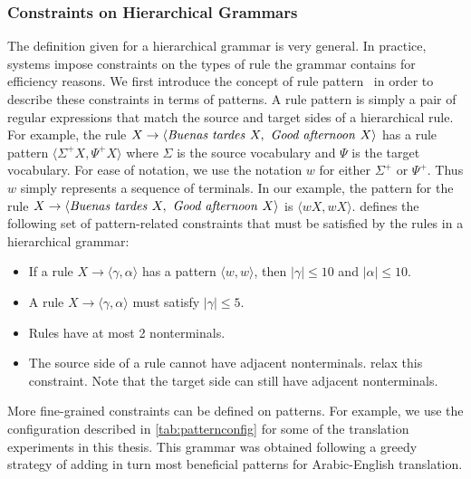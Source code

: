 \subsubsection{Constraints on Hierarchical Grammars}

The definition given for a hierarchical grammar is very general.
In practice, systems impose constraints on the types of rule the grammar contains
for efficiency reasons.
We first introduce the concept of rule
pattern~\citep{iglesias-degispert-banga-byrne:2009:EACL} in order
to describe these constraints in terms of patterns.
A rule pattern is simply a pair of regular expressions that match
the source and target sides of a hierarchical rule.
For example, the rule $X \rightarrow \langle \text{\emph{Buenas tardes }} X, \text{\emph{ Good afternoon }} X \rangle$
has a rule pattern $\langle \Sigma^+ X, \Psi^+ X \rangle$ where $\Sigma$ is the
source vocabulary and $\Psi$ is the target vocabulary.
For ease of notation, we use the notation $w$ for either $\Sigma^+$
or $\Psi^+$. Thus $w$ simply represents a sequence of terminals.
In our example, the pattern for the rule $ X \rightarrow \langle \text{\emph{Buenas tardes }} X, \text{\emph{ Good afternoon }} X \rangle$ is $\langle w X, w X \rangle$.
\citet{chiang:2007:CL} defines the following set of pattern-related constraints
that must be satisfied by the rules in a hierarchical grammar:
%
\begin{itemize}
  \item If a rule $X \rightarrow \langle \gamma, \alpha \rangle$ has a pattern $\langle w, w \rangle$, then $|\gamma| \leq 10$ and $|\alpha| \leq 10$.
  \item A rule $X \rightarrow \langle \gamma, \alpha \rangle$ must satisfy $|\gamma| \leq 5$.
  \item Rules have at most 2 nonterminals.
  \item The source side of a rule cannot have adjacent nonterminals.
    \citet{setiawan-resnik:2010:NAACL} relax this constraint.
    Note that the target side can still
    have adjacent nonterminals. %
  \end{itemize}
%
More fine-grained constraints can be defined on patterns.
For example, we use the configuration described
in \autoref{tab:patternconfig} for some of the translation experiments in this
thesis. This grammar was obtained following a greedy strategy of adding
in turn most beneficial patterns for Arabic-English translation.

